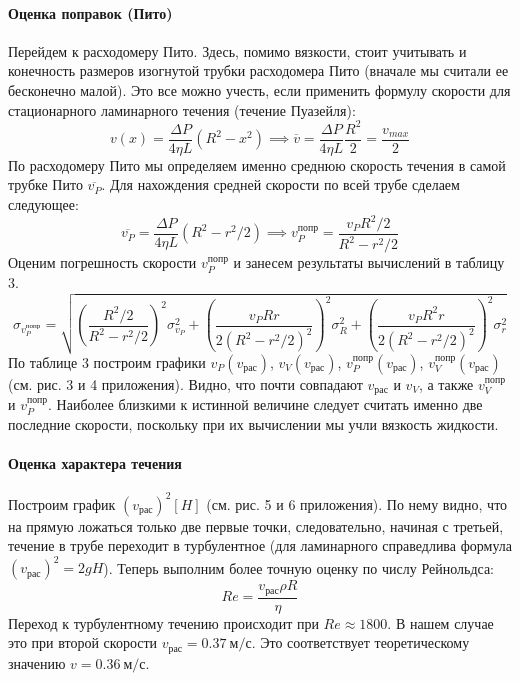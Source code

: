 \documentclass[a4paper, 12pt]{article}
\begin{document}
\paragraph{Оценка поправок (Пито)}
Перейдем к расходомеру Пито. Здесь, помимо вязкости, стоит учитывать и конечность размеров изогнутой трубки расходомера Пито (вначале мы считали ее бесконечно малой). Это все можно учесть, если применить формулу скорости для стационарного ламинарного течения (течение Пуазейля):
\[ v(x) = \frac{\Delta P}{4 \eta L} (R^2 - x^2) \implies \overline{v} = \frac{\Delta P}{4 \eta L} \frac{R^2}{2} = \frac{v_{max}}{2}\]
По расходомеру Пито мы определяем именно среднюю скорость течения в самой трубке Пито $\overline{v_P}$. Для нахождения средней скорости по всей трубе сделаем следующее:
\[ \overline{v_{P}} = \frac{\Delta P}{4 \eta L} (R^2 - r^2/2) \implies v_{P}^{попр} = \frac{v_P R^2/2}{R^2 - r^2/2}\]
Оценим погрешность скорости $v_P^{попр}$ и занесем результаты вычислений в таблицу 3.
\[ \sigma_{v_P^{попр}} = \sqrt{\left(\frac{R^2/2}{R^2 -r^2/2}\right)^2 \sigma_{v_P}^2 + \left(\frac{v_P R r}{2(R^2 -r^2/2)^2}\right)^2 \sigma_{R}^2 + \left(\frac{v_P R^2 r}{2(R^2 -r^2/2)^2}\right)^2 \sigma_{r}^2 }\]
По таблице 3 построим графики $v_P(v_{рас})$, $v_V(v_{рас})$, $v_P^{попр}(v_{рас})$, $v_V^{попр}(v_{рас})$ (см. рис. 3 и 4 приложения). Видно, что почти совпадают $v_{рас}$ и $v_V$, а также $v_V^{попр}$ 
 и $v_P^{попр}$. Наиболее близкими к истинной величине следует считать именно две последние скорости, поскольку при их вычислении мы учли вязкость жидкости.
\paragraph{Оценка характера течения}
Построим график $(v_{рас})^2[H]$ (см. рис. 5 и 6 приложения). По нему видно, что на прямую ложаться только две первые точки, следовательно, начиная с третьей, течение в трубе переходит в турбулентное (для ламинарного справедлива формула $(v_{рас})^2 = 2 g H$).  Теперь выполним более точную оценку по числу Рейнольдса:
\[ Re = \frac{v_{рас} \rho R}{\eta}\]
Переход к турбулентному течению происходит при $Re \approx 1800$. В нашем случае это при второй скорости $v_{рас} = 0.37 \: м/с$. Это соответствует теоретическому значению $v = 0.36 \: м/с$.
\end{document}
